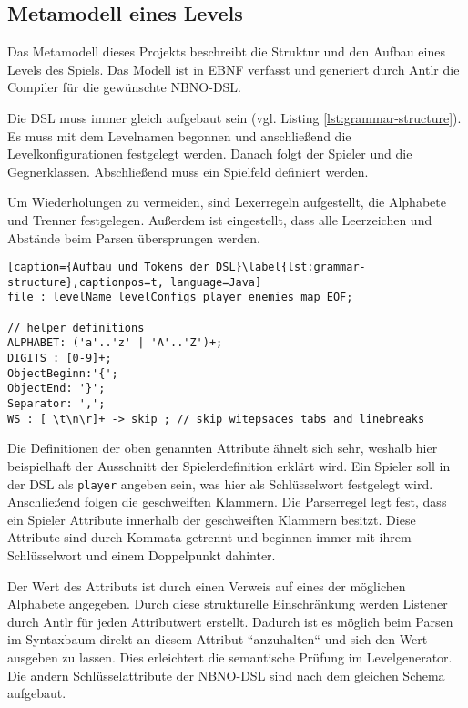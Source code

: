 \subsection{Metamodell eines Levels}
Das Metamodell dieses Projekts beschreibt die Struktur und den Aufbau eines Levels des Spiels. Das Modell ist in EBNF verfasst und generiert durch Antlr die Compiler für die gewünschte NBNO-DSL.

Die DSL muss immer gleich aufgebaut sein (vgl. Listing \ref{lst:grammar-structure}). Es muss mit dem Levelnamen begonnen und anschließend die Levelkonfigurationen festgelegt werden. Danach folgt der Spieler und die Gegnerklassen. Abschließend muss ein Spielfeld definiert werden.

Um Wiederholungen zu vermeiden, sind Lexerregeln aufgestellt, die Alphabete und Trenner festgelegen.
Außerdem ist eingestellt, dass alle Leerzeichen und Abstände beim Parsen übersprungen werden.

\begin{lstlisting}[caption={Aufbau und Tokens der DSL}\label{lst:grammar-structure},captionpos=t, language=Java] 
file : levelName levelConfigs player enemies map EOF;

// helper definitions
ALPHABET: ('a'..'z' | 'A'..'Z')+;
DIGITS : [0-9]+;
ObjectBeginn:'{';
ObjectEnd: '}';
Separator: ',';
WS : [ \t\n\r]+ -> skip ; // skip witepsaces tabs and linebreaks
\end{lstlisting}
 
Die Definitionen der oben genannten Attribute ähnelt sich sehr, weshalb hier beispielhaft der Ausschnitt der Spielerdefinition erklärt wird. Ein Spieler soll in der DSL als \texttt{player} angeben sein, was hier als Schlüsselwort festgelegt wird. Anschließend folgen die geschweiften Klammern. Die Parserregel legt fest, dass ein Spieler Attribute innerhalb der geschweiften Klammern besitzt. Diese Attribute sind durch Kommata getrennt und beginnen immer mit ihrem Schlüsselwort und einem Doppelpunkt dahinter. 

Der Wert des Attributs ist durch einen Verweis auf eines der möglichen Alphabete angegeben. Durch diese strukturelle Einschränkung werden Listener durch Antlr für jeden Attributwert erstellt. Dadurch ist es möglich beim Parsen im Syntaxbaum direkt an diesem Attribut ``anzuhalten`` und sich den Wert ausgeben zu lassen. Dies erleichtert die semantische Prüfung im Levelgenerator. Die andern Schlüsselattribute der NBNO-DSL sind nach dem gleichen Schema aufgebaut. 

